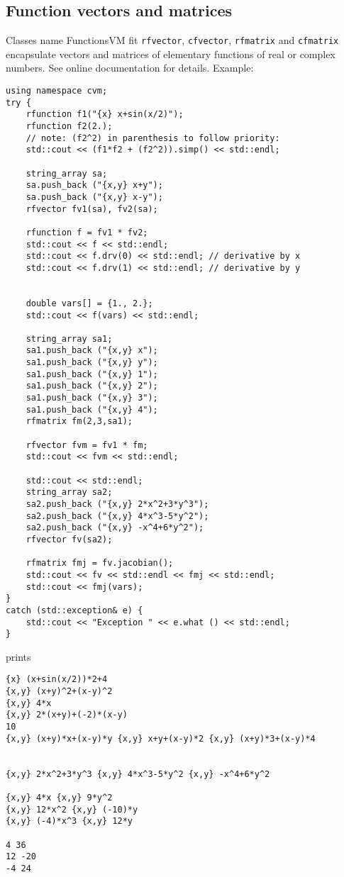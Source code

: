 \subsection{Function vectors and matrices}
Classes%
\pdfdest name {FunctionsVM} fit{}
\verb"rfvector", \verb"cfvector", 
\verb"rfmatrix" and \verb"cfmatrix" 
encapsulate vectors and matrices of elementary functions of real
       or complex numbers.
See online documentation for details.
Example:
\begin{Verbatim}
using namespace cvm;
try {
    rfunction f1("{x} x+sin(x/2)");
    rfunction f2(2.);
    // note: (f2^2) in parenthesis to follow priority:
    std::cout << (f1*f2 + (f2^2)).simp() << std::endl;

    string_array sa;
    sa.push_back ("{x,y} x+y");
    sa.push_back ("{x,y} x-y");
    rfvector fv1(sa), fv2(sa);
    
    rfunction f = fv1 * fv2;
    std::cout << f << std::endl;
    std::cout << f.drv(0) << std::endl; // derivative by x
    std::cout << f.drv(1) << std::endl; // derivative by y


    double vars[] = {1., 2.};
    std::cout << f(vars) << std::endl;
    
    string_array sa1;
    sa1.push_back ("{x,y} x");
    sa1.push_back ("{x,y} y");
    sa1.push_back ("{x,y} 1");
    sa1.push_back ("{x,y} 2");
    sa1.push_back ("{x,y} 3");
    sa1.push_back ("{x,y} 4");
    rfmatrix fm(2,3,sa1);

    rfvector fvm = fv1 * fm;
    std::cout << fvm << std::endl;

    std::cout << std::endl;
    string_array sa2;
    sa2.push_back ("{x,y} 2*x^2+3*y^3");
    sa2.push_back ("{x,y} 4*x^3-5*y^2");
    sa2.push_back ("{x,y} -x^4+6*y^2");
    rfvector fv(sa2);

    rfmatrix fmj = fv.jacobian();
    std::cout << fv << std::endl << fmj << std::endl;
    std::cout << fmj(vars);
}
catch (std::exception& e) {
    std::cout << "Exception " << e.what () << std::endl;
}
\end{Verbatim}
prints
\begin{Verbatim}
{x} (x+sin(x/2))*2+4
{x,y} (x+y)^2+(x-y)^2
{x,y} 4*x
{x,y} 2*(x+y)+(-2)*(x-y)
10
{x,y} (x+y)*x+(x-y)*y {x,y} x+y+(x-y)*2 {x,y} (x+y)*3+(x-y)*4


{x,y} 2*x^2+3*y^3 {x,y} 4*x^3-5*y^2 {x,y} -x^4+6*y^2

{x,y} 4*x {x,y} 9*y^2
{x,y} 12*x^2 {x,y} (-10)*y
{x,y} (-4)*x^3 {x,y} 12*y

4 36
12 -20
-4 24
\end{Verbatim}












\newpage
